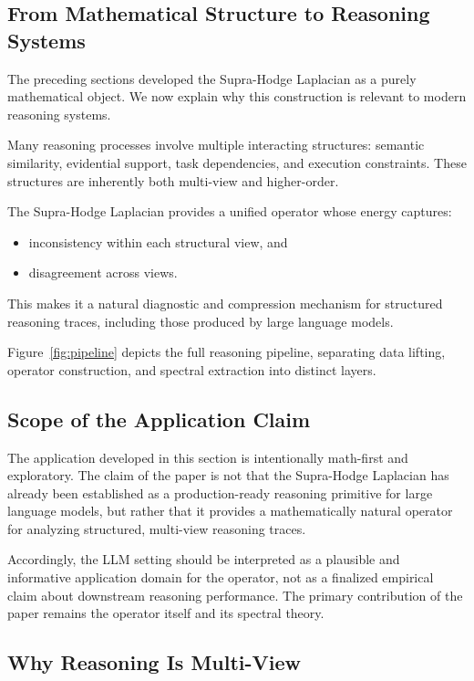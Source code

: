 \documentclass[11pt]{article}
\theoremstyle{definition}
\theoremstyle{remark}
\begin{document}
\subsection{From Mathematical Structure to Reasoning Systems}

The preceding sections developed the Supra-Hodge Laplacian as a purely mathematical object. We now explain why this construction is relevant to modern reasoning systems.

Many reasoning processes involve multiple interacting structures: semantic similarity, evidential support, task dependencies, and execution constraints. These structures are inherently both multi-view and higher-order.

The Supra-Hodge Laplacian provides a unified operator whose energy captures:
\begin{itemize}
    \item inconsistency within each structural view, and
    \item disagreement across views.
\end{itemize}

This makes it a natural diagnostic and compression mechanism for structured reasoning traces, including those produced by large language models.

Figure~\ref{fig:pipeline} depicts the full reasoning pipeline, separating data
lifting, operator construction, and spectral extraction into distinct layers.

\subsection{Scope of the Application Claim}

The application developed in this section is intentionally math-first and exploratory. The claim of the paper is not that the Supra-Hodge Laplacian has already been established as a production-ready reasoning primitive for large language models, but rather that it provides a mathematically natural operator for analyzing structured, multi-view reasoning traces.

Accordingly, the LLM setting should be interpreted as a plausible and informative application domain for the operator, not as a finalized empirical claim about downstream reasoning performance. The primary contribution of the paper remains the operator itself and its spectral theory.

\subsection{Why Reasoning Is Multi-View}
\end{document}

